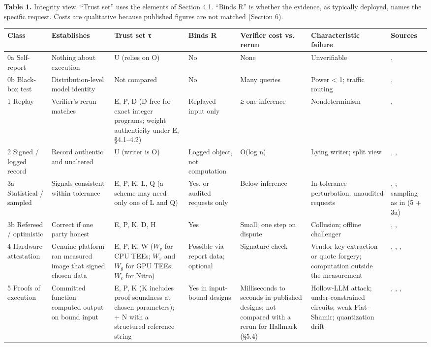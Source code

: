 \documentclass[11pt]{article}
\begin{document}
\textbf{Table 1.} Integrity view. ``Trust set'' uses the elements of Section 4.1. ``Binds R'' is whether the evidence, as typically deployed, names the specific request. Costs are qualitative because published figures are not matched (Section 6).

{\footnotesize\setlength\tabcolsep{2.5pt}
\begin{xltabular}{\linewidth}{XXXXXXX}
\toprule
\textbf{Class} & \textbf{Establishes} & \textbf{Trust set τ} & \textbf{Binds R} & \textbf{Verifier cost vs. rerun} & \textbf{Characteristic failure} & \textbf{Sources} \\ \midrule
\endhead
0a Self-report & Nothing about execution & U (relies on O) & No & None & Unverifiable & \cite{C25}, \cite{D23} \\
0b Black-box test & Distribution-level model identity & Not compared & No & Many queries & Power < 1; traffic routing & \cite{C14}, \cite{C15} \\
1 Replay & Verifier's rerun matches & E, P, D (D free for exact integer programs; weight authenticity under E, \S{}4.1--4.2) & Replayed input only & ≥ one inference & Nondeterminism & \cite{C1}, \cite{C2} \\
2 Signed / logged record & Record authentic and unaltered & U (writer is O) & Logged object, not computation & O(log n) & Lying writer; split view & \cite{C16}, \cite{C17}, \cite{C20} \\
3a Statistical / sampled & Signals consistent within tolerance & E, P, K, L, Q (a scheme may need only one of L and Q) & Yes, or audited requests only & Below inference & In-tolerance perturbation; unaudited requests & \cite{C11}, \cite{C12}; sampling as in \cite{C13} (5 + 3a) \\
3b Refereed / optimistic & Correct if one party honest & E, P, K, D, H & Yes & Small; one step on dispute & Collusion; offline challenger & \cite{C6}, \cite{C8}, \cite{C9} \\
4 Hardware attestation & Genuine platform ran measured image that signed chosen data & E, P, K, W ($W_v$ for CPU TEEs; $W_v$ and $W_g$ for GPU TEEs; $W_c$ for Nitro) & Possible via report data; optional & Signature check & Vendor key extraction or quote forgery; computation outside the measurement & \cite{B2}, \cite{B5}, \cite{B16}, \cite{B24} \\
5 Proofs of execution & Committed function computed output on bound input & E, P, K (K includes proof soundness at chosen parameters); + N with a structured reference string & Yes in input-bound designs & Milliseconds to seconds in published designs; not compared with a rerun for Hallmark (\S{}5.4) & Hollow-LLM attack; under-constrained circuits; weak Fiat--Shamir; quantization drift & \cite{A5}, \cite{A23}, \cite{F1}, \cite{F2} \\
\bottomrule
\end{xltabular}}
\end{document}
